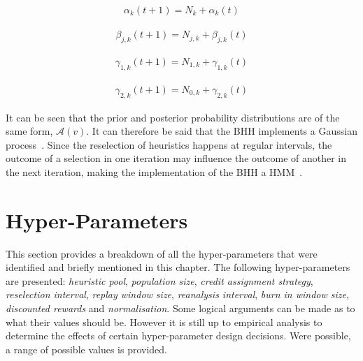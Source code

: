\begin{equation}
      \label{eq:bhh:optimisation_step:map:alpha_update_operation}
      \begin{split}
            \alpha_{k}(t+1) = N_{k} + \alpha_{k}(t)
      \end{split}
\end{equation}

\begin{equation}
      \label{eq:bhh:optimisation_step:map:beta_update_operation}
      \begin{split}
            \beta_{j,k}(t+1) = N_{j,k} + \beta_{j,k}(t)
      \end{split}
\end{equation}

\begin{equation}
      \label{eq:bhh:optimisation_step:map:gamma1_update_operation}
      \begin{split}
            \gamma_{1,k}(t+1) = N_{1,k} + \gamma_{1,k}(t)
      \end{split}
\end{equation}

\begin{equation}
      \label{eq:bhh:optimisation_step:map:gamma2_update_operation}
      \begin{split}
            \gamma_{2,k}(t+1) = N_{0,k} + \gamma_{2,k}(t)
      \end{split}
\end{equation}

It can be seen that the prior and posterior probability distributions are of the same form, $\mathcal{A}(v)$. It can therefore be said that the \acs{BHH} implements a Gaussian process~\cite{ref:gortler:2019}. Since the reselection of heuristics happens at regular intervals, the outcome of a selection in one iteration may influence the outcome of another in the next iteration, making the implementation of the \acs{BHH} a \acs{HMM}~\cite{ref:rabiner:1986}.


\section{Hyper-Parameters}\label{sec:bhh:hyper_parameters}

This section provides a breakdown of all the hyper-parameters that were identified and briefly mentioned in this chapter. The following hyper-parameters are presented: \textit{heuristic pool}, \textit{population size}, \textit{credit assignment strategy}, \textit{reselection interval}, \textit{replay window size}, \textit{reanalysis interval}, \textit{burn in window size}, \textit{discounted rewards} and \textit{normalisation}. Some logical arguments can be made as to what their values should be. However it is still up to empirical analysis to determine the effects of certain hyper-parameter design decisions. Were possible, a range of possible values is provided.

